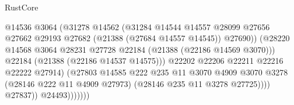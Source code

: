 \begin{lexlean}{RustCore}
\begin{coremodule}
                                                    @14536
                                                    @3064
                                                    (@31278
                                                      @14562
                                                      (@31284
                                                        @14544
                                                        @14557
                                                        @28099
                                                        @27656
                                                        @27662
                                                        @29193
                                                        @27682
                                                        (@21388 (@27684 @14557 @14545))
                                                        @27690))
                                                    (@28220
                                                      @14568
                                                      @3064
                                                      @28231
                                                      @27728
                                                      @22184
                                                      (@21388 (@22186 @14569 @3070)))
                                                    @22184
                                                    (@21388 (@22186 @14537 @14575)))
                                                  @22202
                                                  @22206
                                                  @22211
                                                  @22216
                                                  @22222
                                                  @27914)
                                                (@27803
                                                  @14585
                                                  @222
                                                  @235
                                                  @11
                                                  @3070
                                                  @4909
                                                  @3070
                                                  @3278
                                                  (@28146 @222 @11 @4909 @27973)
                                                  (@28146 @235 @11 @3278 @27725))))
                                            @27837))
                                        @24493)))))))

\end{coremodule}
\end{lexlean}
